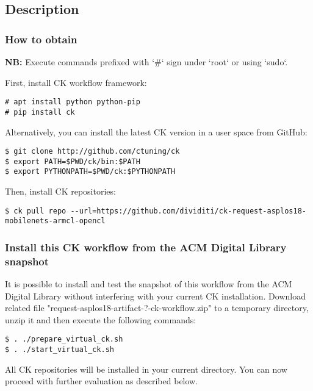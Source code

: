 \subsection{Description}

\subsubsection{How to obtain}

\textbf{NB:} Execute commands prefixed with `\#` sign under `root` or using `sudo`.

First, install CK workflow framework:

\begin{verbatim}
# apt install python python-pip
# pip install ck
\end{verbatim}

Alternatively, you can install the latest CK version in a user space from GitHub:
\begin{verbatim}
$ git clone http://github.com/ctuning/ck
$ export PATH=$PWD/ck/bin:$PATH
$ export PYTHONPATH=$PWD/ck:$PYTHONPATH
\end{verbatim}

\noindent Then, install CK repositories:
\begin{verbatim}
$ ck pull repo --url=https://github.com/dividiti/ck-request-asplos18-mobilenets-armcl-opencl
\end{verbatim}

\subsubsection{Install this CK workflow from the ACM Digital Library snapshot}

It is possible to install and test the snapshot of this workflow 
from the ACM Digital Library without interfering with your current CK installation.
Download related file "request-asplos18-artifact-?-ck-workflow.zip"
to a temporary directory, unzip it and then execute the following commands:

\begin{verbatim}
$ . ./prepare_virtual_ck.sh
$ . ./start_virtual_ck.sh
\end{verbatim}

All CK repositories will be installed in your current directory.
You can now proceed with further evaluation as described below.

